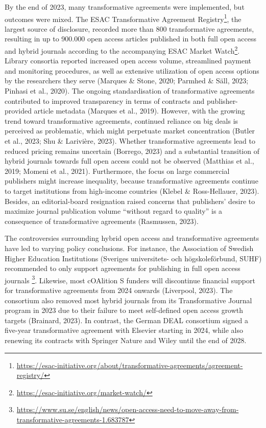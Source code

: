 \documentclass[a4paper,man,floatsintext,longtable,noextraspace,12pt]{apa6}
\begin{document}
By the end of 2023, many transformative agreements were implemented, but
outcomes were mixed. The ESAC Transformative Agreement
Registry\footnote{\url{https://esac-initiative.org/about/transformative-agreements/agreement-registry/}},
the largest source of disclosure, recorded more than 800 transformative
agreements, resulting in up to 900.000 open access articles published in
both full open access and hybrid journals according to the accompanying
ESAC Market Watch\footnote{\url{https://esac-initiative.org/market-watch/}}.
Library consortia reported increased open access volume, streamlined
payment and monitoring procedures, as well as extensive utilization of
open access options by the researchers they serve (Marques \& Stone,
2020; Parmhed \& Säll, 2023; Pinhasi et al., 2020). The ongoing
standardisation of transformative agreements contributed to improved
transparency in terms of contracts and publisher-provided article
metadata (Marques et al., 2019). However, with the growing trend toward
transformative agreements, continued reliance on big deals is perceived
as problematic, which might perpetuate market concentration (Butler et
al., 2023; Shu \& Larivière, 2023). Whether transformative agreements
lead to reduced pricing remains uncertain (Borrego, 2023) and a
substantial transition of hybrid journals towards full open access could
not be observed (Matthias et al., 2019; Momeni et al., 2021).
Furthermore, the focus on large commercial publishers might increase
inequality, because transformative agreements continue to target
institutions from high-income countries (Klebel \& Ross-Hellauer, 2023).
Besides, an editorial-board resignation raised concerns that publishers'
desire to maximize journal publication volume ``without regard to
quality'' is a consequence of transformative agreements (Rasmussen,
2023).

The controversies surrounding hybrid open access and transformative
agreements have led to varying policy conclusions. For instance, the
Association of Swedish Higher Education Institutions (Sveriges
universitets- och högskoleförbund, SUHF) recommended to only support
agreements for publishing in full open access journals \footnote{\url{https://www.su.se/english/news/open-access-need-to-move-away-from-transformative-agreements-1.683787}}.
Likewise, most cOAlition S funders will discontinue financial support
for transformative agreements from 2024 onwards (Liverpool, 2023). The
consortium also removed most hybrid journals from its Transformative
Journal program in 2023 due to their failure to meet self-defined open
access growth targets (Brainard, 2023). In contrast, the German DEAL
consortium signed a five-year transformative agreement with Elsevier
starting in 2024, while also renewing its contracts with Springer Nature
and Wiley until the end of 2028.
\end{document}
